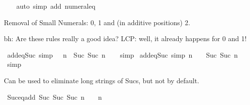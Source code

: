 \begin{isabellebody}
%
\isadelimproof
\ \ %
\endisadelimproof
%
\isatagproof
{}\isamarkupfalse%
\ {\isacharparenleft}{\kern0pt}auto\ simp\ add{\isacharcolon}{\kern0pt}\ numeral{\isacharunderscore}{\kern0pt}{}{\isacharunderscore}{\kern0pt}eq{\isacharunderscore}{\kern0pt}{}{\isacharparenright}{\kern0pt}%
\endisatagproof
{\isafoldproof}%
%
\isadelimproof
%
\endisadelimproof
%
\begin{isamarkuptext}%
Removal of Small Numerals: 0, 1 and (in additive positions) 2.%
\end{isamarkuptext}\isamarkuptrue%
%
\begin{isamarkuptext}%
bh: Are these rules really a good idea? LCP: well, it already happens for 0 and 1!%
\end{isamarkuptext}\isamarkuptrue%
\isamarkupfalse%
\ add{\isacharunderscore}{\kern0pt}{}{\isacharunderscore}{\kern0pt}eq{\isacharunderscore}{\kern0pt}Suc\ {\isacharbrackleft}{\kern0pt}simp{\isacharbrackright}{\kern0pt}{\isacharcolon}{\kern0pt}\ {\isachardoublequoteopen}{}\ {\isacharplus}{\kern0pt}\ n\ {\isacharequal}{\kern0pt}\ Suc\ {\isacharparenleft}{\kern0pt}Suc\ n{\isacharparenright}{\kern0pt}{\isachardoublequoteclose}\isanewline
%
\isadelimproof
\ \ %
\endisadelimproof
%
\isatagproof
{}\isamarkupfalse%
\ simp%
\endisatagproof
{\isafoldproof}%
%
\isadelimproof
\isanewline
%
\endisadelimproof
\isanewline
{}\isamarkupfalse%
\ add{\isacharunderscore}{\kern0pt}{}{\isacharunderscore}{\kern0pt}eq{\isacharunderscore}{\kern0pt}Suc{\isacharprime}{\kern0pt}\ {\isacharbrackleft}{\kern0pt}simp{\isacharbrackright}{\kern0pt}{\isacharcolon}{\kern0pt}\ {\isachardoublequoteopen}n\ {\isacharplus}{\kern0pt}\ {}\ {\isacharequal}{\kern0pt}\ Suc\ {\isacharparenleft}{\kern0pt}Suc\ n{\isacharparenright}{\kern0pt}{\isachardoublequoteclose}\isanewline
%
\isadelimproof
\ \ %
\endisadelimproof
%
\isatagproof
{}\isamarkupfalse%
\ simp%
\endisatagproof
{\isafoldproof}%
%
\isadelimproof
%
\endisadelimproof
%
\begin{isamarkuptext}%
Can be used to eliminate long strings of Sucs, but not by default.%
\end{isamarkuptext}\isamarkuptrue%
\isamarkupfalse%
\ Suc{}{\isacharunderscore}{\kern0pt}eq{\isacharunderscore}{\kern0pt}add{\isacharunderscore}{\kern0pt}{}{\isacharcolon}{\kern0pt}\ {\isachardoublequoteopen}Suc\ {\isacharparenleft}{\kern0pt}Suc\ {\isacharparenleft}{\kern0pt}Suc\ n{\isacharparenright}{\kern0pt}{\isacharparenright}{\kern0pt}\ {\isacharequal}{\kern0pt}\ {}\ {\isacharplus}{\kern0pt}\ n{\isachardoublequoteclose}\isanewline

\end{isabellebody}
